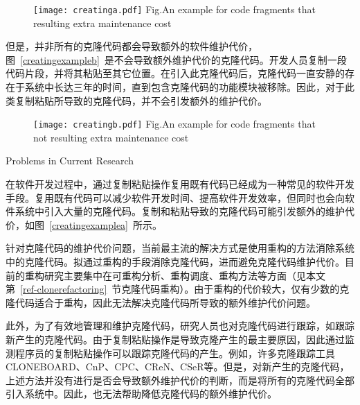 \begin{figure}[htbp]
\centering
\texttt{[image: creatinga.pdf]}
{Fig.$\!$}{An example for code fragments that resulting extra maintenance cost}
\vspace{-1em}
\end{figure}


但是，并非所有的克隆代码都会导致额外的软件维护代价，图~\ref{creatingexampleb}~是不会导致额外维护代价的克隆代码。开发人员复制一段代码片段，并将其粘贴至其它位置。在引入此克隆代码后，克隆代码一直安静的存在于系统中长达三年的时间，直到包含克隆代码的功能模块被移除。因此，对于此类复制粘贴所导致的克隆代码，并不会引发额外的维护代价。

\begin{figure}[htbp]
\centering
\texttt{[image: creatingb.pdf]}
{Fig.$\!$}{An example for code fragments that not resulting extra maintenance cost}
\vspace{-1em}
\end{figure}

{Problems in Current Research}

在软件开发过程中，通过复制粘贴操作复用既有代码已经成为一种常见的软件开发手段\cite{koschke2007survey}。复用既有代码可以减少软件开发时间、提高软件开发效率，但同时也会向软件系统中引入大量的克隆代码。复制和粘贴导致的克隆代码可能引发额外的维护代价，如图~\ref{creatingexamplea}~所示。

针对克隆代码的维护代价问题，当前最主流的解决方式是使用重构的方法消除系统中的克隆代码。拟通过重构的手段消除克隆代码，进而避免克隆代码维护代价。目前的重构研究主要集中在可重构分析\cite{lin2014detecting,mende2009evaluation,schulze2008towards,choi2011extracting}、重构调度\cite{mandal2014automatic,lee2011automated,zibran2011constraint}、重构方法\cite{higo2008metric,krishnan2014unification,barbosa2013removing,ettinger2017efficient}等方面（见本文第~\ref{ref-clonerefactoring}~节克隆代码重构）。由于重构的代价较大，仅有少数的克隆代码适合于重构，因此无法解决克隆代码所导致的额外维护代价问题。

此外，为了有效地管理和维护克隆代码，研究人员也对克隆代码进行跟踪，如跟踪新产生的克隆代码。由于复制粘贴操作是导致克隆产生的最主要原因，因此通过监测程序员的复制粘贴操作可以跟踪克隆代码的产生。例如，许多克隆跟踪工具CLONEBOARD\cite{de2009managing}、CnP\cite{hou2009cnp}、CPC\cite{weckerle2008cpc}、CReN\cite{jablonski2007cren}、CSeR\cite{jacob2010actively}等。但是，对新产生的克隆代码，上述方法并没有进行是否会导致额外维护代价的判断，而是将所有的克隆代码全部引入系统中。因此，也无法帮助降低克隆代码的额外维护代价。

